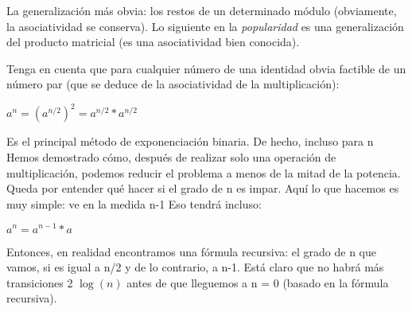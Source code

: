 La generalización más obvia: los restos de un determinado módulo (obviamente, la asociatividad se conserva). Lo siguiente en la \emph{popularidad} es una generalización del producto matricial (es una asociatividad bien conocida).

Tenga en cuenta que para cualquier número de una identidad obvia factible de un número par (que se deduce de la asociatividad de la multiplicación):

$a^{n}=(a^{n/2})^{2}=a^{n/2} *a^{n/2} $

Es el principal método de exponenciación binaria. De hecho, incluso para n Hemos demostrado cómo, después de realizar solo una operación de multiplicación, podemos reducir el problema a menos de la mitad de la potencia. Queda por entender qué hacer si el grado de n es impar. Aquí lo que hacemos es muy simple: ve en la medida n-1 Eso tendrá incluso:

$a^{n}=a^{n-1}*a$

Entonces, en realidad encontramos una fórmula recursiva: el grado de n que vamos, si es igual a n/2 y de lo contrario, a n-1. Está claro que no habrá más transiciones 2 $\log( n)$ antes de que lleguemos a n = 0 (basado en la fórmula recursiva).